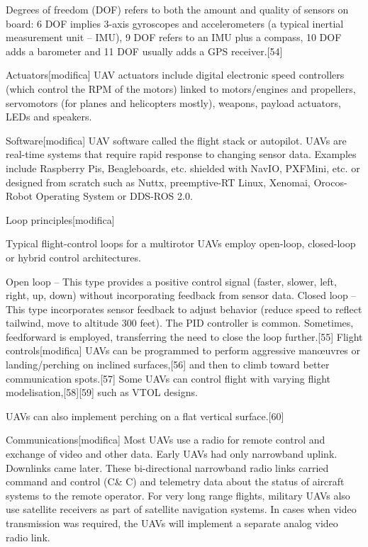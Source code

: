 Degrees of freedom (DOF) refers to both the amount and quality of sensors on board: 6 DOF implies 3-axis gyroscopes and accelerometers (a typical inertial measurement unit – IMU), 9 DOF refers to an IMU plus a compass, 10 DOF adds a barometer and 11 DOF usually adds a GPS receiver.[54]

Actuators[modifica]
UAV actuators include digital electronic speed controllers (which control the RPM of the motors) linked to motors/engines and propellers, servomotors (for planes and helicopters mostly), weapons, payload actuators, LEDs and speakers.

Software[modifica]
UAV software called the flight stack or autopilot. UAVs are real-time systems that require rapid response to changing sensor data. Examples include Raspberry Pis, Beagleboards, etc. shielded with NavIO, PXFMini, etc. or designed from scratch such as Nuttx, preemptive-RT Linux, Xenomai, Orocos-Robot Operating System or DDS-ROS 2.0.

Loop principles[modifica]

Typical flight-control loops for a multirotor
UAVs employ open-loop, closed-loop or hybrid control architectures.

Open loop – This type provides a positive control signal (faster, slower, left, right, up, down) without incorporating feedback from sensor data.
Closed loop – This type incorporates sensor feedback to adjust behavior (reduce speed to reflect tailwind, move to altitude 300 feet). The PID controller is common. Sometimes, feedforward is employed, transferring the need to close the loop further.[55]
Flight controls[modifica]
UAVs can be programmed to perform aggressive manœuvres or landing/perching on inclined surfaces,[56] and then to climb toward better communication spots.[57] Some UAVs can control flight with varying flight modelisation,[58][59] such as VTOL designs.

UAVs can also implement perching on a flat vertical surface.[60]

Communications[modifica]
Most UAVs use a radio for remote control and exchange of video and other data. Early UAVs had only narrowband uplink. Downlinks came later. These bi-directional narrowband radio links carried command and control (C\& C) and telemetry data about the status of aircraft systems to the remote operator. For very long range flights, military UAVs also use satellite receivers as part of satellite navigation systems. In cases when video transmission was required, the UAVs will implement a separate analog video radio link.

